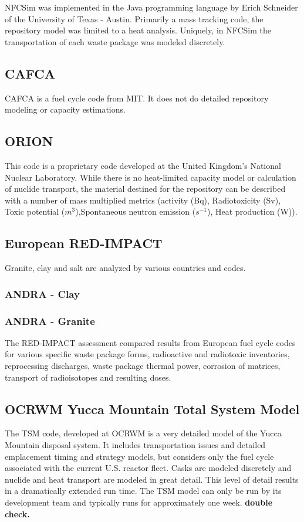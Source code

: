 NFCSim was implemented in the Java programming language by Erich Schneider of the 
University of Texas - Austin. Primarily a mass tracking code, the repository 
model was limited to a heat analysis. Uniquely, in NFCSim the transportation of 
each waste package was modeled discretely. \cite{schneider_nfcsim_2004}

\subsection{CAFCA}

CAFCA is a fuel cycle code from MIT. It does not do detailed repository modeling 
or capacity estimations.


\subsection{ORION} This code is a proprietary code developed at the United
Kingdom's National Nuclear Laboratory. While there is no heat-limited capacity 
model or calculation of nuclide transport, the material destined for the 
repository can be described with a number of mass multiplied metrics (activity 
(Bq), Radiotoxicity (Sv),  Toxic potential ($m^3$),Spontaneous neutron emission 
($s^{-1}$), Heat production (W)).

\subsection{European RED-IMPACT} Granite, clay and salt are analyzed by various
countries and codes.

\subsubsection{ANDRA - Clay}

\subsubsection{ANDRA - Granite}


The RED-IMPACT assessment compared
results from European fuel cycle codes for various specific waste package
forms, radioactive and radiotoxic inventories, reprocessing discharges,  waste
package thermal power, corrosion of matrices, transport of radioisotopes and
resulting doses.


\subsection{OCRWM Yucca Mountain Total System Model} The \gls{TSM} code, 
developed at \gls{OCRWM} is a very detailed model of the Yucca Mountain disposal 
system. It includes transportation issues and detailed emplacement timing and 
strategy models, but considers only the fuel cycle associated with the current  
U.S.  reactor fleet. Casks are modeled discretely and nuclide and heat transport 
are modeled in great detail.\cite{turner_discrete_2010} This level of detail 
results in a dramatically extended run time. The \gls{TSM} model can only be 
run by its development team and typically runs for approximately one week. 
\textbf{double check.} 

